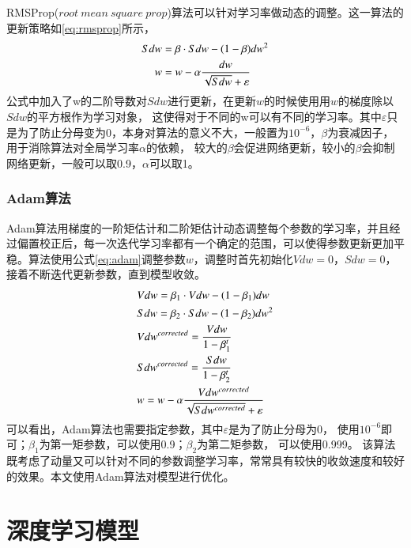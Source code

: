 RMSProp($root~mean~square~prop$)算法\cite{hinton2012neural}可以针对学习率做动态的调整。这一算法的更新策略如\eqref{eq:rmsprop}所示，
\begin{equation}
\begin{aligned}
\centering
Sdw & =\beta \cdot Sdw-(1-\beta )dw^2 \\
w & =w- \alpha \frac{dw}{\sqrt{Sdw}+\varepsilon }
\end{aligned}
\label{eq:rmsprop}
\end{equation}
公式中加入了w的二阶导数对$Sdw$进行更新，在更新$w$的时候使用用$w$的梯度除以$Sdw$的平方根作为学习对象，
这使得对于不同的w可以有不同的学习率。其中$\varepsilon$只是为了防止分母变为0，本身对算法的意义不大，一般置为${10}^{-6}$，$\beta$为衰减因子，用于消除算法对全局学习率$\alpha$的依赖，
较大的$\beta$会促进网络更新，较小的$\beta$会抑制网络更新，一般可以取0.9，$\alpha$可以取1。

\subsubsection{Adam算法}

Adam\cite{kingma2014adam}算法用梯度的一阶矩估计和二阶矩估计动态调整每个参数的学习率，并且经过偏置校正后，每一次迭代学习率都有一个确定的范围，可以使得参数更新更加平稳。算法使用公式\eqref{eq:adam}调整参数$w$，调整时首先初始化$Vdw=0$，$Sdw=0$，
接着不断迭代更新参数，直到模型收敛。
\begin{equation}
\begin{aligned}
\centering
&Vdw  =\beta_1 \cdot Vdw-(1-\beta_1 )dw \\
&Sdw  =\beta_2 \cdot Sdw-(1-\beta_2 )dw^2 \\
&Vdw^{corrected}  =\frac{Vdw}{1-\beta_1^t}\\
&Sdw^{corrected}  =\frac{Sdw}{1-\beta_2^t}\\
&w  =w- \alpha \frac{Vdw^{corrected}}{\sqrt{Sdw^{corrected}}+\varepsilon }
\end{aligned}
\label{eq:adam}
\end{equation}
可以看出，Adam算法也需要指定参数，其中$\varepsilon$是为了防止分母为0，
使用${10}^{-6}$即可；$\beta_1$为第一矩参数，可以使用0.9；$\beta_2$为第二矩参数，
可以使用0.999。
该算法既考虑了动量又可以针对不同的参数调整学习率，常常具有较快的收敛速度和较好的效果。本文使用Adam算法对模型进行优化。

\section{深度学习模型}

